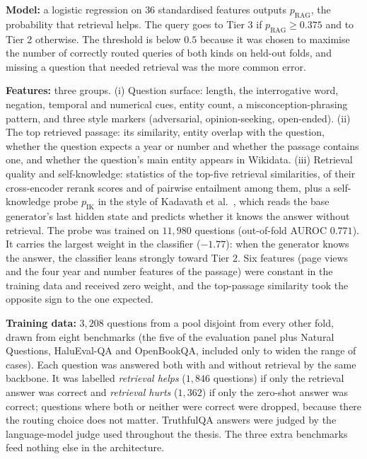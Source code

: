 \textbf{Model:} a logistic regression on $36$ standardised features outputs $p_{\text{RAG}}$, the probability that retrieval helps. The query goes to Tier 3 if $p_{\text{RAG}} \ge 0.375$ and to Tier 2 otherwise. The threshold is below $0.5$ because it was chosen to maximise the number of correctly routed queries of both kinds on held-out folds, and missing a question that needed retrieval was the more common error.

\textbf{Features:} three groups. (i) Question surface: length, the interrogative word, negation, temporal and numerical cues, entity count, a misconception-phrasing pattern, and three style markers (adversarial, opinion-seeking, open-ended). (ii) The top retrieved passage: its similarity, entity overlap with the question, whether the question expects a year or number and whether the passage contains one, and whether the question's main entity appears in Wikidata. (iii) Retrieval quality and self-knowledge: statistics of the top-five retrieval similarities, of their cross-encoder rerank scores and of pairwise entailment among them, plus a self-knowledge probe $p_{\text{IK}}$ in the style of Kadavath et al.~\cite{kadavath2022language}, which reads the base generator's last hidden state and predicts whether it knows the answer without retrieval. The probe was trained on $11{,}980$ questions (out-of-fold AUROC $0.771$). It carries the largest weight in the classifier ($-1.77$): when the generator knows the answer, the classifier leans strongly toward Tier 2. Six features (page views and the four year and number features of the passage) were constant in the training data and received zero weight, and the top-passage similarity took the opposite sign to the one expected.

\textbf{Training data:} $3{,}208$ questions from a pool disjoint from every other fold, drawn from eight benchmarks (the five of the evaluation panel plus Natural Questions, HaluEval-QA and OpenBookQA, included only to widen the range of cases). Each question was answered both with and without retrieval by the same backbone. It was labelled \emph{retrieval helps} ($1{,}846$ questions) if only the retrieval answer was correct and \emph{retrieval hurts} ($1{,}362$) if only the zero-shot answer was correct; questions where both or neither were correct were dropped, because there the routing choice does not matter. TruthfulQA answers were judged by the language-model judge used throughout the thesis. The three extra benchmarks feed nothing else in the architecture.

